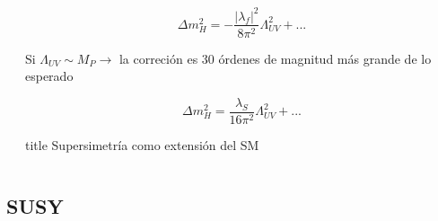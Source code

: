 \documentclass[10pt, compress,spanish]{beamer}
\begin{document}
\begin{frame}[fragile]
\begin{columns}
\begin{column}{0.5\textwidth}
\end{column}


\begin{column}{0.5\textwidth} 

\vspace{-0.5cm}

\begin{equation*}
\Delta m_{H}^{2}=-\frac{|\lambda_{f}|^{2}}{8\pi^{2}}\Lambda_{UV}^{2}+...
\end{equation*}

Si $\Lambda_{UV} \sim M_{P} \longrightarrow$ la correción es 30 órdenes de magnitud más grande de lo esperado
  
\vspace{0.5cm}

\begin{equation*}
\Delta m_{H}^{2}=\frac{\lambda_{S}}{16\pi^{2}}\Lambda_{UV}^{2} + ...
\end{equation*}

\vspace{0.2cm}

  \begin{beamercolorbox}[leftskip=\titlelf]{title}
    \centering{}\normalsize Supersimetría como extensión del SM
  \end{beamercolorbox}

\end{column}
\end{columns}


\end{frame}




\subsection{SUSY}
\end{document}
